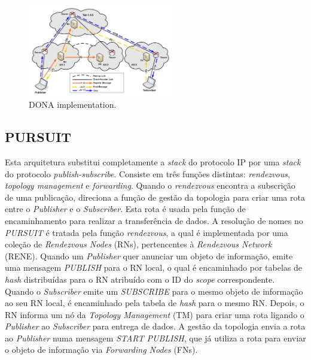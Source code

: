 \documentclass[conference]{IEEEtran}
\begin{document}
\begin{figure}[h]
\centering
\includegraphics[width=2.5in]{dona}
\caption{DONA implementation.}
\label{dona}
\end{figure}

\subsection{PURSUIT}
Esta arquitetura substitui completamente a \textit{stack} do protocolo IP por uma \textit{stack} do protocolo \textit{publish-subscribe}. Consiste em tr\^{e}s fun\c{c}\~{o}es distintas: \textit{rendezvous}, \textit{topology management} e \textit{forwarding}. Quando o \textit{rendezvous} encontra a subscri\c{c}\~{a}o de uma publica\c{c}\~{a}o, direciona a fun\c{c}\~{a}o de gest\~{a}o da topologia para criar uma rota entre o \textit{Publisher} e o \textit{Subscriber}. Esta rota \'{e} usada pela fun\c{c}\~{a}o de encaminhamento para realizar a transfer\^{e}ncia de dados. A resolu\c{c}\~{a}o de nomes no \textit{PURSUIT} \'{e} tratada pela fun\c{c}\~{a}o \textit{rendezvous}, a qual \'{e} implementada por uma cole\c{c}\~{a}o de \textit{Rendezvous Nodes} (RNs), pertencentes \`{a} \textit{Rendezvous Network} (RENE). Quando um \textit{Publisher} quer anunciar um objeto de informa\c{c}\~{a}o, emite uma mensagem \textit{PUBLISH} para o RN local, o qual \'{e} encaminhado por tabelas de \textit{hash} distribu\'{i}das para o RN atribu\'{i}do com o ID do \textit{scope} correspondente. Quando o \textit{Subscriber} emite um \textit{SUBSCRIBE} para o mesmo objeto de informa\c{c}\~{a}o ao seu RN local, \'{e} encaminhado pela tabela de \textit{hash} para o mesmo RN. Depois, o RN informa um n\'{o} da \textit{Topology Management} (TM) para criar uma rota ligando o \textit{Publisher} ao \textit{Subscriber} para entrega de dados. A gest\~{a}o da topologia envia a rota ao \textit{Publisher} numa mensagem \textit{START PUBLISH}, que j\'{a} utiliza a rota para enviar o objeto de informa\c{c}\~{a}o via \textit{Forwarding Nodes} (FNs).
\end{document}
